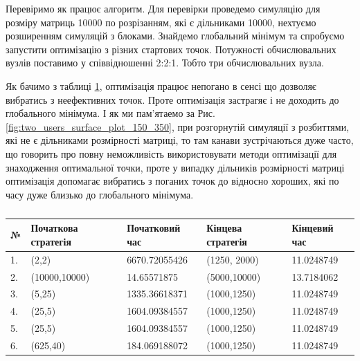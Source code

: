 Перевіримо як працює алгоритм. Для перевірки проведемо симуляцію для розміру матриць 10000 по розрізанням, які є дільниками 10000, нехтуємо розширенням симуляцій з блоками. Знайдемо глобальний мінімум та спробуємо запустити оптимізацію з різних стартових точок. Потужності обчислювальних вузлів поставимо у співвідношенні 2:2:1. Тобто три обчислювальних вузла.

Як бачимо з таблиці \ref{table:optimize_results}, оптимізація працює непогано в сенсі що дозволяє вибратись з неефективних точок. Проте оптимізація застрагяє і не доходить до глобального мінімума. І як ми пам'ятаемо за Рис. \ref{fig:two_users_surface_plot_150_350}, при розгорнутій симуляції з розбиттями, які не є дільниками розмірності матриці, то там канави зустрічаються дуже часто, що говорить про повну неможливість використовувати методи оптимізації для знаходження оптимальної точки, проте у випадку дільників розмірності матриці оптимізація допомагає вибратись з поганих точок до відносно хороших, які по часу дуже близько до глобального мінімума.

\begin{table}[H]
	\caption{}
	\label{table:optimize_results}
	\begin{tabular}{|l|l|l|l|l|}
		\hline
		№ & Початкова стратегія & Початковий час 	& Кінцева стратегія & Кінцевий час
		\\ \hline
		1.& (2,2)				& 6670.72055426     &(1250, 2000) 		& 11.0248749
		\\ \hline
		2.& (10000,10000)		& 14.65571875   	&  (5000,10000)		& 13.7184062
		\\ \hline
		3.& (5,25)				& 1335.36618371		&  (1000,1250)		& 11.0248749
		\\ \hline
		4.& (25,5)				& 1604.09384557		&  (1000,1250)		& 11.0248749
		\\ \hline
		5.& (25,5)				& 1604.09384557		&  (1000,1250)		& 11.0248749
		\\ \hline
		6.& (625,40)			& 184.069188072		&  (1000,1250)		& 11.0248749
		\\ \hline
		
	\end{tabular}
\end{table}

